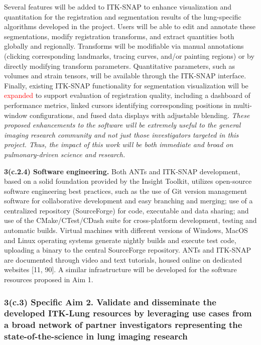 \documentclass[11pt,]{article}
\begin{document}
Several features will be added to ITK-SNAP to enhance visualization and
quantitation for the registration and segmentation results of the
lung-specific algorithms developed in the project. Users will be able to
edit and annotate these segmentations, modify registration transforms,
and extract quantities both globally and regionally. Transforms will be
modifiable via manual annotations (clicking corresponding landmarks,
tracing curves, and/or painting regions) or by directly modifying
transform parameters. Quantitative parameters, such as volumes and
strain tensors, will be available through the ITK-SNAP interface.
Finally, existing ITK-SNAP functionality for segmentation visualization
will be \textcolor{red}{expanded} to support evaluation of registration
quality, including a dashboard of performance metrics, linked cursors
identifying corresponding positions in multi-window configurations, and
fused data displays with adjustable blending. \emph{These proposed
enhancements to the software will be extremely useful to the general
imaging research community and not just those investigators targeted in
this project. Thus, the impact of this work will be both immediate and
broad on pulmonary-driven science and research.}

\textbf{3(c.2.4) Software engineering.} Both ANTs and ITK-SNAP
development, based on a solid foundation provided by the Insight
Toolkit, utilizes open-source software engineering best practices, such
as the use of Git version management software for collaborative
development and easy branching and merging; use of a centralized
repository (SourceForge) for code, executable and data sharing; and use
of the CMake/CTest/CDash suite for cross-platform development, testing
and automatic builds. Virtual machines with different versions of
Windows, MacOS and Linux operating systems generate nightly builds and
execute test code, uploading a binary to the central SourceForge
repository. ANTs and ITK-SNAP are documented through video and text
tutorials, housed online on dedicated websites {[}11, 90{]}. A similar
infrastructure will be developed for the software resources proposed in
Aim 1.

\subsubsection{\texorpdfstring{3(c.3) \textbf{Specific Aim 2.} Validate
and disseminate the developed ITK-Lung resources by leveraging use cases
from a broad network of partner investigators representing the
state-of-the-science in lung imaging
research}{3(c.3) Specific Aim 2. Validate and disseminate the developed ITK-Lung resources by leveraging use cases from a broad network of partner investigators representing the state-of-the-science in lung imaging research}}\label{c.3-specific-aim-2.-validate-and-disseminate-the-developed-itk-lung-resources-by-leveraging-use-cases-from-a-broad-network-of-partner-investigators-representing-the-state-of-the-science-in-lung-imaging-research}
\end{document}
